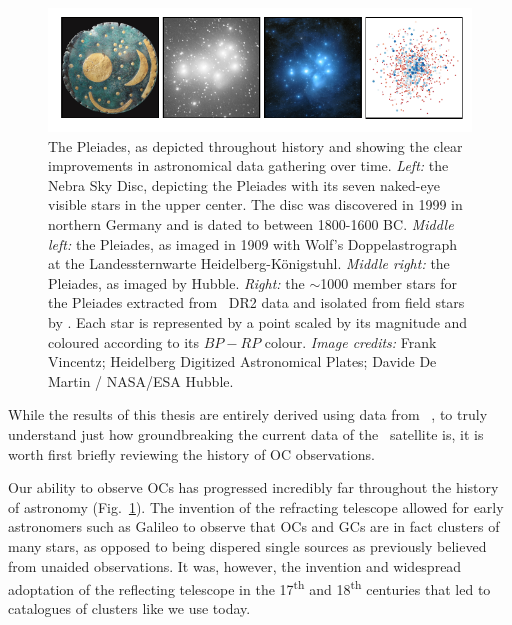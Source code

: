 \begin{figure}[tb]
	\includegraphics[width=\textwidth]{fig/c1/pleiades.pdf}
	\caption[The Pleiades as depicted throughout history]{The Pleiades, as depicted throughout history and showing the clear improvements in astronomical data gathering over time. \emph{Left:} the Nebra Sky Disc, depicting the Pleiades with its seven naked-eye visible stars in the upper center. The disc was discovered in 1999 in northern Germany and is dated to between 1800-1600 BC. \emph{Middle left:} the Pleiades, as imaged in 1909 with Wolf's Doppelastrograph at the Landessternwarte Heidelberg-Königstuhl. \emph{Middle right:} the Pleiades, as imaged by Hubble. \emph{Right:} the $\sim$1000 member stars for the Pleiades extracted from \gaia\ DR2 data and isolated from field stars by \cite{cantat-gaudin_characterising_2018}. Each star is represented by a point scaled by its magnitude and coloured according to its $BP-RP$ colour. \emph{Image credits:} Frank Vincentz; Heidelberg Digitized Astronomical Plates; Davide De Martin / NASA/ESA Hubble.}
	\label{fig:intro:history:pleiades}
\end{figure}

While the results of this thesis are entirely derived using data from \gaia\ , to truly understand just how groundbreaking the current data of the \gaia\ satellite is, it is worth first briefly reviewing the history of OC observations.

Our ability to observe OCs has progressed incredibly far throughout the history of astronomy (Fig.~\ref{fig:intro:history:pleiades}). The invention of the refracting telescope allowed for early astronomers such as Galileo to observe that OCs and GCs are in fact clusters of many stars, as opposed to being dispered single sources as previously believed from unaided observations. It was, however, the invention and widespread adoptation of the reflecting telescope in the 17\textsuperscript{th} and 18\textsuperscript{th} centuries that led to catalogues of clusters like we use today.

